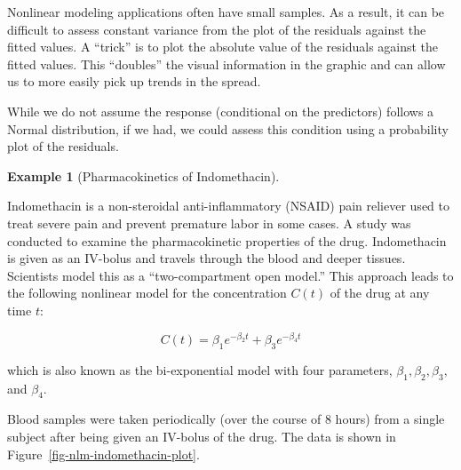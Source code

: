 \documentclass[
  letterpaper,
  DIV=11,
  numbers=noendperiod]{scrreprt}
\theoremstyle{definition}
\theoremstyle{definition}
\newtheorem{example}{Example}[chapter]
\theoremstyle{remark}
\begin{document}
\begin{tcolorbox}[enhanced jigsaw, left=2mm, toprule=.15mm, arc=.35mm, breakable, opacitybacktitle=0.6, opacityback=0, rightrule=.15mm, colbacktitle=quarto-callout-note-color!10!white, coltitle=black, leftrule=.75mm, toptitle=1mm, colframe=quarto-callout-note-color-frame, titlerule=0mm, title=\textcolor{quarto-callout-note-color}{\faInfo}\hspace{0.5em}{Note}, bottomrule=.15mm, colback=white, bottomtitle=1mm]

Nonlinear modeling applications often have small samples. As a result,
it can be difficult to assess constant variance from the plot of the
residuals against the fitted values. A ``trick'' is to plot the absolute
value of the residuals against the fitted values. This ``doubles'' the
visual information in the graphic and can allow us to more easily pick
up trends in the spread.

\end{tcolorbox}

\begin{tcolorbox}[enhanced jigsaw, left=2mm, toprule=.15mm, arc=.35mm, breakable, opacitybacktitle=0.6, opacityback=0, rightrule=.15mm, colbacktitle=quarto-callout-note-color!10!white, coltitle=black, leftrule=.75mm, toptitle=1mm, colframe=quarto-callout-note-color-frame, titlerule=0mm, title=\textcolor{quarto-callout-note-color}{\faInfo}\hspace{0.5em}{Note}, bottomrule=.15mm, colback=white, bottomtitle=1mm]

While we do not assume the response (conditional on the predictors)
follows a Normal distribution, if we had, we could assess this condition
using a probability plot of the residuals.

\end{tcolorbox}

\begin{example}[Pharmacokinetics of
Indomethacin]\protect\hypertarget{exm-nlm-indomethacin}{}\label{exm-nlm-indomethacin}

Indomethacin is a non-steroidal anti-inflammatory (NSAID) pain reliever
used to treat severe pain and prevent premature labor in some cases. A
study was conducted to examine the pharmacokinetic properties of the
drug. Indomethacin is given as an IV-bolus and travels through the blood
and deeper tissues. Scientists model this as a ``two-compartment open
model.'' This approach leads to the following nonlinear model for the
concentration \(C(t)\) of the drug at any time \(t\):

\[C(t) = \beta_1 e^{-\beta_2 t} + \beta_3 e^{-\beta_4 t}\]

which is also known as the bi-exponential model with four parameters,
\(\beta_1, \beta_2, \beta_3,\) and \(\beta_4\).

Blood samples were taken periodically (over the course of 8 hours) from
a single subject after being given an IV-bolus of the drug. The data is
shown in Figure~\ref{fig-nlm-indomethacin-plot}.

\end{example}
\end{document}
